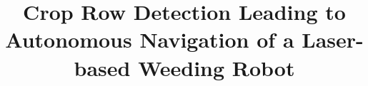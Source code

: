 \documentclass[10pt,oneside,a4paper]{report}
\begin{document}
\title{Crop Row Detection Leading to Autonomous Navigation of a Laser-based Weeding Robot}




\maketitle
\pagestyle{plain}

\pagestyle{empty}
%




\setcounter{tocdepth}{2}

\tableofcontents
\cleardoublepage



\cleardoublepage


\cleardoublepage

\pagestyle{fancy}



\cleardoublepage

\cleardoublepage

\cleardoublepage

\cleardoublepage


\cleardoublepage
\end{document}
